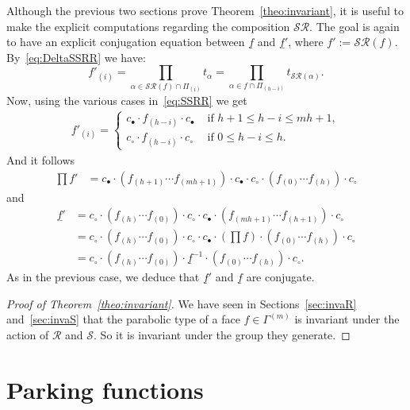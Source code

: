 \documentclass[11pt]{article}
\theoremstyle{definition}
\newcommand{\RR}{\mathcal{R}}
\renewcommand{\SS}{\mathcal{S}}
\begin{document}
Although the previous two sections prove Theorem~\ref{theo:invariant}, it is useful to make the explicit computations regarding the composition $\SS\RR$.  The goal is again to have an explicit conjugation equation between $\underline{f}$ and $\underline{f'}$, where $f' := \SS\RR(f)$.  By~\eqref{eq:DeltaSSRR} we have:
\[
    f'_{(i)} 
    =
    \prod_{ \alpha \in \SS\RR(f) \cap \varPi_{(i)}} t_\alpha = \prod_{ \alpha \in f \cap \varPi_{(h-i)}} t_{\SS\RR(\alpha)}.
\]
Now, using the various cases in~\eqref{eq:SSRR} we get
\begin{align} \label{eq:SR}
    f'_{(i)} =
    \begin{cases}
        c_\bullet \cdot f_{(h-i)} \cdot c_\bullet & \text{ if } h+1 \leq h-i \leq mh+1, \\
        c_\circ \cdot f_{(h-i)} \cdot c_\circ & \text{ if } 0 \leq h-i \leq h.
    \end{cases}
\end{align}
And it follows
\begin{align}
    \prod f' 
    &= c_\bullet \cdot ( f_{(h+1)} \cdots f_{(mh+1)} ) \cdot c_\bullet \cdot c_\circ \cdot ( f_{(0)} \cdots f_{(h)}) \cdot c_\circ
\end{align}
and
\begin{align}
    \underline{f'} &=
    c_\circ \cdot ( f_{(h)} \cdots f_{(0)}) \cdot c_\circ \cdot c_\bullet \cdot ( f_{(mh+1)} \cdots f_{(h+1)} ) \cdot c_\circ \\
    &= c_\circ \cdot ( f_{(h)} \cdots f_{(0)}) \cdot c_\circ \cdot c_\bullet \cdot (\prod f) \cdot ( f_{(0)} \cdots f_{(h)} ) \cdot c_\circ \\
    &= c_\circ \cdot ( f_{(h)} \cdots f_{(0)}) \cdot \underline{f}^{-1} \cdot ( f_{(0)} \cdots f_{(h)} ) \cdot c_\circ.
\end{align}
As in the previous case, we deduce that $\underline{f}'$ and $\underline{f}$ are conjugate.

\begin{proof}[Proof of Theorem~\ref{theo:invariant}]
    We have seen in Sections~\ref{sec:invaR} and~\ref{sec:invaS} that the parabolic type of a face $f\in\Gamma^{(m)}$ is invariant under the action of $\RR$ and $\SS$.  So it is invariant under the group they generate.
\end{proof}

\section{Parking functions}
\label{sec:parking}
\end{document}
